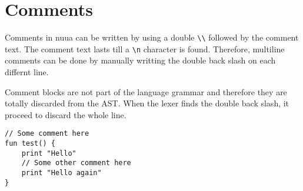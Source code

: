 \section{Comments}

Comments in nuua can be written by using a double \texttt{\textbackslash\textbackslash} followed by the comment text.
The comment text lasts till a \texttt{\textbackslash n} character is found. Therefore, multiline comments can be done
by manually writting the double back slash on each differnt line.

Comment blocks are not part of the language grammar and therefore they are totally discarded from the AST. When
the lexer finds the double back slash, it proceed to discard the whole line.

\begin{lstlisting}
// Some comment here
fun test() {
    print "Hello"
    // Some other comment here
    print "Hello again"
}
\end{lstlisting}
